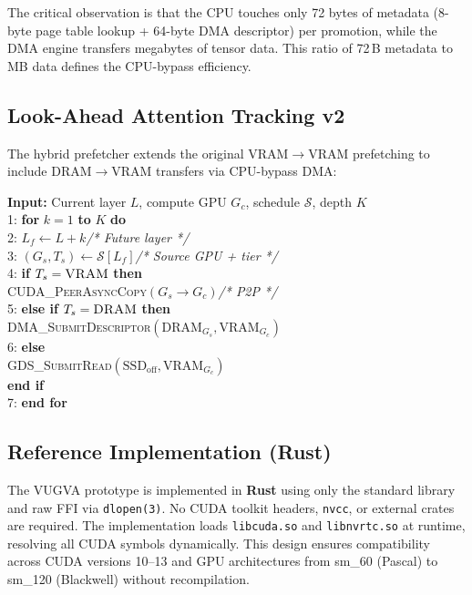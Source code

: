 \documentclass[11pt,twocolumn]{article}
\begin{document}
The critical observation is that the CPU touches only 72 bytes of metadata (8-byte page table lookup + 64-byte DMA descriptor) per promotion, while the DMA engine transfers megabytes of tensor data. This ratio of 72\,B metadata to MB data defines the CPU-bypass efficiency.

\subsection{Look-Ahead Attention Tracking v2}

The hybrid prefetcher extends the original VRAM$\rightarrow$VRAM prefetching to include DRAM$\rightarrow$VRAM transfers via CPU-bypass DMA:

\begin{tcolorbox}[colback=codebg, colframe=vugvaorange, title={\textbf{Algorithm 3:} Hybrid Look-Ahead Prefetch (CPU-Bypass)}, fonttitle=\small]
\small\ttfamily
\textbf{Input:} Current layer $L$, compute GPU $G_c$, schedule $\mathcal{S}$, depth $K$\\[4pt]
1: \textbf{for} $k = 1$ \textbf{to} $K$ \textbf{do}\\
\phantom{1: }2: $L_f \leftarrow L + k$\hfill{\textit{/* Future layer */}}\\
\phantom{1: }3: $(G_s, T_s) \leftarrow \mathcal{S}[L_f]$\hfill{\textit{/* Source GPU + tier */}}\\
\phantom{1: }4: \textbf{if} $T_s = \textsc{VRAM}$ \textbf{then}\\
\phantom{1:4: }\textsc{CUDA\_PeerAsyncCopy}$(G_s \to G_c)$\hfill{\textit{/* P2P */}}\\
\phantom{1: }5: \textbf{else if} $T_s = \textsc{DRAM}$ \textbf{then}\\
\phantom{1:5: }\textsc{DMA\_SubmitDescriptor}$(\text{DRAM}_{G_s}, \text{VRAM}_{G_c})$\\
\phantom{1: }6: \textbf{else}\\
\phantom{1:6: }\textsc{GDS\_SubmitRead}$(\text{SSD}_{\text{off}}, \text{VRAM}_{G_c})$\\
\phantom{1: }\textbf{end if}\\
7: \textbf{end for}
\end{tcolorbox}

\subsection{Reference Implementation (Rust)}

The VUGVA prototype is implemented in \textbf{Rust} using only the standard library and raw FFI via \texttt{dlopen(3)}. No CUDA toolkit headers, \texttt{nvcc}, or external crates are required. The implementation loads \texttt{libcuda.so} and \texttt{libnvrtc.so} at runtime, resolving all CUDA symbols dynamically. This design ensures compatibility across CUDA versions 10--13 and GPU architectures from sm\_60 (Pascal) to sm\_120 (Blackwell) without recompilation.
\end{document}

